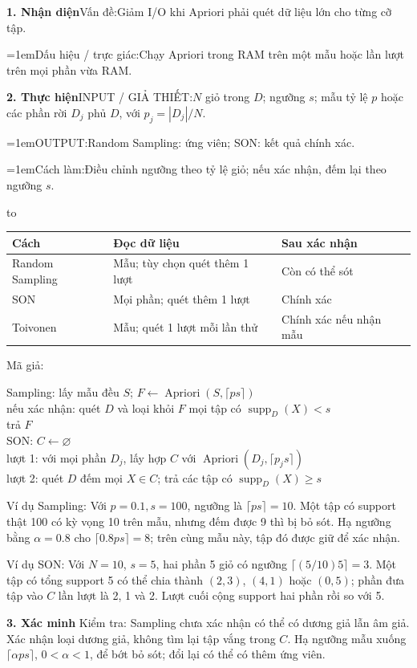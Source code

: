 \documentclass[10pt,a4paper,twocolumn]{article}
\makeatletter
\newcommand{\key}[1]{#1:\enspace}
\newenvironment{examtable}[1]{%
  \par\addvspace{2pt}\noindent\hbox to \linewidth\bgroup\hfil
  \setlength{\tabcolsep}{4pt}%
  \renewcommand{\arraystretch}{1.12}\begin{tabular}{#1}%
}{\end{tabular}\hfil\egroup\par\addvspace{2pt}}
\newcommand{\algfield}[2]{\par\noindent\hangindent=1em\relax#1:\enspace#2}
\newcommand{\unitheading}[2]{%
  \par\addvspace{1pt}\noindent\textbf{#1. #2}\enspace}
\newcommand{\unitverification}{\unitheading{3}{Xác minh}}
\newcommand{\unitfield}[4]{%
  \par\noindent\textbf{#1. #2}\enspace #3:\enspace #4}
\newcommand{\algsummary}[6]{%
  \begingroup\setlength{\parskip}{1pt}%
  \unitfield{1}{Nhận diện}{Vấn đề}{#1}%
  \algfield{Dấu hiệu / trực giác}{#2}%
  \if\relax\detokenize{#3}\relax\else\par\noindent#3\par\fi%
  \unitfield{2}{Thực hiện}{INPUT / GIẢ THIẾT}{#4}%
  \algfield{OUTPUT}{#5}%
  \algfield{Cách làm}{#6}\par\endgroup}
\newenvironment{algpseudo}{%
  \par\addvspace{2pt}\noindent
  \setlength{\parskip}{0pt}%
  Mã giả:\par\nobreak
  \begin{list}{}{\setlength{\leftmargin}{1em}\setlength{\topsep}{0pt}%
    \setlength{\partopsep}{0pt}\setlength{\parsep}{0pt}%
    \@beginparpenalty=10000\relax}%
  \item\relax
}{\end{list}\par\addvspace{3pt}}
\makeatother
\begin{document}
\algsummary{Giảm I/O khi Apriori phải quét dữ liệu lớn cho từng cỡ tập.}{Chạy Apriori trong RAM trên một mẫu hoặc lần lượt trên mọi phần vừa RAM.}{}{$N$ giỏ trong $D$; ngưỡng $s$; mẫu tỷ lệ $p$ hoặc các phần rời $D_j$ phủ $D$, với $p_j=|D_j|/N$.}{Random Sampling: ứng viên; SON: kết quả chính xác.}{Điều chỉnh ngưỡng theo tỷ lệ giỏ; nếu xác nhận, đếm lại theo ngưỡng $s$.}

\begin{examtable}{@{}lll@{}}
\toprule
Cách & Đọc dữ liệu & Sau xác nhận \\
\midrule
Random Sampling & Mẫu; tùy chọn quét thêm 1 lượt & Còn có thể sót \\
SON & Mọi phần; quét thêm 1 lượt & Chính xác \\
Toivonen & Mẫu; quét 1 lượt mỗi lần thử & Chính xác nếu nhận mẫu \\
\bottomrule
\end{examtable}

\begin{algpseudo}
Sampling: lấy mẫu đều $S$; $F\gets\operatorname{Apriori}(S,\lceil ps\rceil)$\\
\quad nếu xác nhận: quét $D$ và loại khỏi $F$ mọi tập có $\operatorname{supp}_D(X)<s$\\
\quad trả $F$\\
SON: $C\gets\varnothing$\\
\quad lượt 1: với mọi phần $D_j$, lấy hợp $C$ với $\operatorname{Apriori}(D_j,\lceil p_js\rceil)$\\
\quad lượt 2: quét $D$ đếm mọi $X\in C$; trả các tập có $\operatorname{supp}_D(X)\ge s$
\end{algpseudo}

\key{Ví dụ Sampling} Với $p=0.1,s=100$, ngưỡng là $\lceil ps\rceil=10$. Một tập có support thật 100 có kỳ vọng 10 trên mẫu, nhưng đếm được 9 thì bị bỏ sót. Hạ ngưỡng bằng $\alpha=0.8$ cho $\lceil0.8ps\rceil=8$; trên cùng mẫu này, tập đó được giữ để xác nhận.

\key{Ví dụ SON} Với $N=10$, $s=5$, hai phần 5 giỏ có ngưỡng $\lceil(5/10)5\rceil=3$. Một tập có tổng support 5 có thể chia thành $(2,3)$, $(4,1)$ hoặc $(0,5)$; phần đưa tập vào $C$ lần lượt là 2, 1 và 2. Lượt cuối cộng support hai phần rồi so với 5.

\unitverification
\key{Kiểm tra} Sampling chưa xác nhận có thể có dương giả lẫn âm giả. Xác nhận loại dương giả, không tìm lại tập vắng trong $C$. Hạ ngưỡng mẫu xuống $\lceil\alpha ps\rceil$, $0<\alpha<1$, để bớt bỏ sót; đổi lại có thể có thêm ứng viên.
\end{document}
